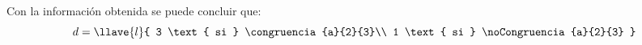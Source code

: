 Con la información obtenida se puede concluir que:
$$
d = 
\llave{l}{
        3 \text{ si } \congruencia{a}{2}{3}\\ 
        1 \text{ si } \noCongruencia{a}{2}{3}
}
$$

\begin{aportes}
  \item {}
  \item {}

\end{aportes}
